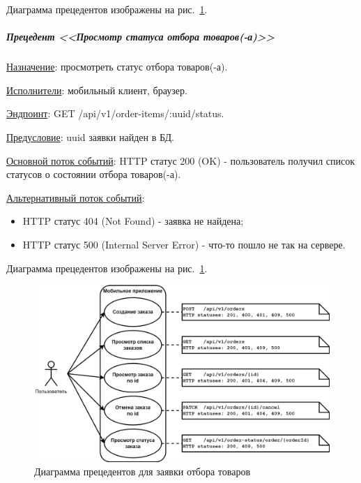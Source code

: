 Диаграмма прецедентов изображены на рис.~\ref{fig:UML_precedent_order_items}.


\subparagraph{Прецедент <<Просмотр статуса отбора товаров(-а)>>} \hspace{0pt}

\underline{Назначение}: просмотреть статус отбора товаров(-а).

\underline{Исполнители}: мобильный клиент, браузер.

\underline{Эндпоинт}: GET /api/v1/order-items/:uuid/status.

\underline{Предусловие}: uuid заявки найден в БД.

\underline{Основной поток событий}: HTTP статус 200 (OK) - пользователь получил список статусов о состоянии отбора товаров(-а). 

\underline{Альтернативный поток событий}:

\begin{itemize}
    \item HTTP статус 404 (Not Found) - заявка не найдена;
    \item HTTP статус 500 (Internal Server Error) - что-то пошло не так на сервере.
\end{itemize}

Диаграмма прецедентов изображены на рис.~\ref{fig:UML_precedent_order_items}.


\begin{figure}[!htb]
    \centering

    \includegraphics[width=18cm]
    {images/UML/UML_precedent_order_items.png}

    \caption{Диаграмма прецедентов для заявки отбора товаров}

    \label{fig:UML_precedent_order_items}
\end{figure}

